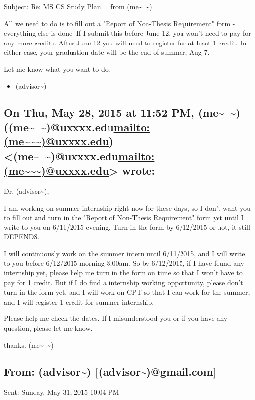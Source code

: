 \documentclass[9pt,b5paper]{article}
\begin{document}
Subject: Re: MS CS Study Plan \_ from (me\textasciitilde{}~\textasciitilde{})

All we need to do is to fill out a "Report of Non-Thesis Requirement" form - everything else is done. If I submit this before June 12, you won't need to pay for any more credits. After June 12 you will need to register for at least 1 credit. In either case, your graduation date will be the end of summer, Aug 7.

Let me know what you want to do.

\begin{itemize}
\item (advisor\textasciitilde{})
\end{itemize}

\subsection{On Thu, May 28, 2015 at 11:52 PM, (me\textasciitilde{}~\textasciitilde{}) ((me\textasciitilde{}~\textasciitilde{})@uxxxx.edu\url{mailto:(me~~~)@uxxxx.edu}) <(me\textasciitilde{}~\textasciitilde{})@uxxxx.edu\url{mailto:(me~~~)@uxxxx.edu}> wrote:}
\label{sec-7-2}
Dr. (advisor\textasciitilde{}),

I am working on summer internship right now for these days, so I don't want you to fill out and turn in the "Report of Non-Thesis Requirement" form yet until I write to you on 6/11/2015 evening. Turn in the form by 6/12/2015 or not, it still DEPENDS.

I will continuously work on the summer intern until 6/11/2015, and I will write to you before 6/12/2015 morning 8:00am. So by 6/12/2015, if I have found any internship yet, please help me turn in the form on time so that I won't have to pay for 1 credit. But if I do find a internship working opportunity, please don't turn in the form yet, and I will work on CPT so that I can work for the summer, and I will register 1 credit for summer internship.

Please help me check the dates. If I misunderstood you or if you have any question, please let me know.

thanks.
(me\textasciitilde{}~\textasciitilde{})

\subsection{From: (advisor\textasciitilde{}) [(advisor\textasciitilde{})@gmail.com]}
\label{sec-7-3}
Sent: Sunday, May 31, 2015 10:04 PM
\end{document}
